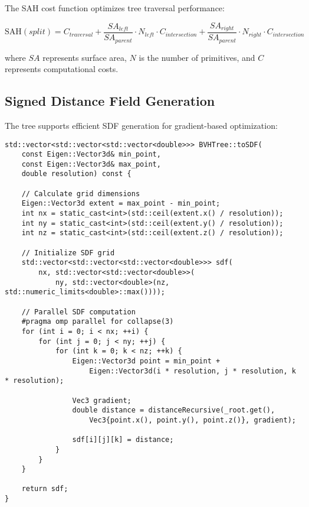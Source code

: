 The SAH cost function optimizes tree traversal performance:

\begin{equation}
\text{SAH}(split) = C_{traversal} + \frac{SA_{left}}{SA_{parent}} \cdot N_{left} \cdot C_{intersection} + \frac{SA_{right}}{SA_{parent}} \cdot N_{right} \cdot C_{intersection}
\end{equation}

where $SA$ represents surface area, $N$ is the number of primitives, and $C$ represents computational costs.

\subsection{Signed Distance Field Generation}

The \bvh{} tree supports efficient SDF generation for gradient-based optimization:

\begin{lstlisting}[caption={SDF Generation Algorithm}, label={lst:sdf_generation}]
std::vector<std::vector<std::vector<double>>> BVHTree::toSDF(
    const Eigen::Vector3d& min_point,
    const Eigen::Vector3d& max_point,
    double resolution) const {
    
    // Calculate grid dimensions
    Eigen::Vector3d extent = max_point - min_point;
    int nx = static_cast<int>(std::ceil(extent.x() / resolution));
    int ny = static_cast<int>(std::ceil(extent.y() / resolution));
    int nz = static_cast<int>(std::ceil(extent.z() / resolution));
    
    // Initialize SDF grid
    std::vector<std::vector<std::vector<double>>> sdf(
        nx, std::vector<std::vector<double>>(
            ny, std::vector<double>(nz, std::numeric_limits<double>::max())));
    
    // Parallel SDF computation
    #pragma omp parallel for collapse(3)
    for (int i = 0; i < nx; ++i) {
        for (int j = 0; j < ny; ++j) {
            for (int k = 0; k < nz; ++k) {
                Eigen::Vector3d point = min_point + 
                    Eigen::Vector3d(i * resolution, j * resolution, k * resolution);
                
                Vec3 gradient;
                double distance = distanceRecursive(_root.get(), 
                    Vec3{point.x(), point.y(), point.z()}, gradient);
                
                sdf[i][j][k] = distance;
            }
        }
    }
    
    return sdf;
}
\end{lstlisting}

